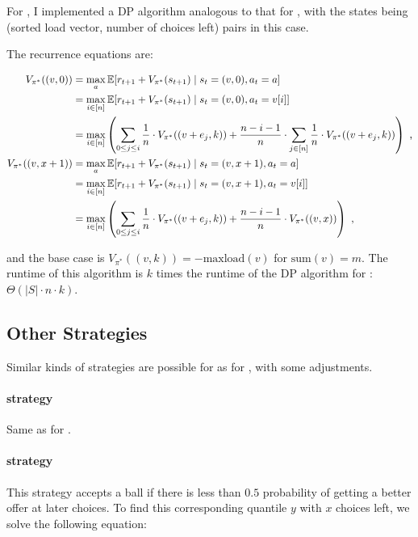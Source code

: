 For \KThinning, I implemented a DP algorithm analogous to that for \TwoThinning, with the states being (sorted load vector, number of choices left) pairs in this case.


The recurrence equations are:

\begin{align} 
    V_{\pi^*}((v, 0)) &= \max_a \mathbb{E} [r_{t+1} + V_{\pi^*}(s_{t+1}) \mid s_t=(v,0), a_t=a] \notag \\
    &= \max_{i \in [n]} \mathbb{E} [r_{t+1} + V_{\pi^*}(s_{t+1}) \mid s_t=(v,0), a_t=v[i]] \notag \\
    &= \max_{i \in [n]} \left(\sum_{0\leq j \leq i} \frac{1}{n}\cdot V_{\pi^*}((v+e_j,k)) + \frac{n-i-1}{n} \cdot  \sum_{j \in [n]} \frac{1}{n}\cdot V_{\pi^*}((v+e_j,k))\right) \text{ ,} \label{eq:kthinning-dynamicprogramming} \\
    V_{\pi^*}((v, x+1)) &= \max_a \mathbb{E} [r_{t+1} + V_{\pi^*}(s_{t+1}) \mid s_t=(v,x+1), a_t=a] \notag \\
    &= \max_{i \in [n]} \mathbb{E} [r_{t+1} + V_{\pi^*}(s_{t+1}) \mid s_t=(v, x+1), a_t=v[i]] \notag \\
    &= \max_{i \in [n]} \left(\sum_{0\leq j \leq i} \frac{1}{n}\cdot V_{\pi^*}((v+e_j,k)) + \frac{n-i-1}{n} \cdot  V_{\pi^*}((v, x))\right) \text{ ,}
\end{align}

and the base case is $V_{\pi^*}((v, k))=-\mathrm{maxload}(v)$ for $\mathrm{sum}(v)=m$. The runtime of this algorithm is $k$ times the runtime of the DP algorithm for \TwoThinning: $\Theta(|S|\cdot n\cdot k)$.


\subsection{Other Strategies}

Similar kinds of strategies are possible for \KThinning as for \TwoThinning, with some adjustments.

\paragraph{\AlwaysAccept strategy} Same as for \TwoThinning.


\paragraph{\Quantile strategy} This strategy accepts a ball if there is less than $0.5$ probability of getting a better offer at later choices. To find this corresponding quantile $y$ with $x$ choices left, we solve the following equation:

